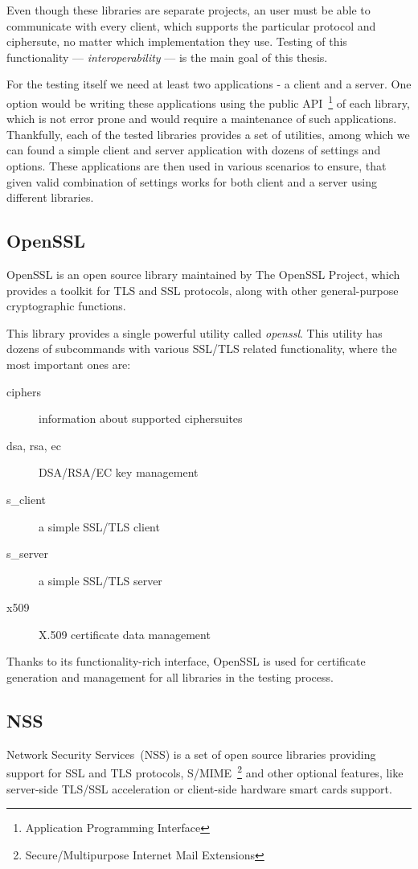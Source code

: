     Even though these libraries are
    separate projects, an user must be able to communicate with every client,
    which supports the particular protocol and ciphersute, no matter which
    implementation they use. Testing of this functionality --- \textit{interoperability} ---
    is the main goal of this thesis.

    For the testing itself we need at least two applications - a client and a server.
    One option would be writing these applications using the public
    API~\footnote{Application Programming Interface} of each library,
    which is not error prone and would require a maintenance of such applications.
    Thankfully, each of the tested libraries provides a set of utilities,
    among which we can found a simple client and server application with
    dozens of settings and options. These applications are then used in
    various scenarios to ensure, that given valid combination of settings works
    for both client and a server using different libraries.

\subsection{OpenSSL}
    OpenSSL is an open source library maintained by The OpenSSL Project,
    which provides a toolkit for TLS and SSL
    protocols, along with other general-purpose cryptographic functions.

    This library provides a single powerful utility called \textit{openssl}. This
    utility has dozens of subcommands with various SSL/TLS related functionality,
    where the most important ones are:
    \begin{description}
        \item [ciphers] information about supported ciphersuites
        \item [dsa, rsa, ec] DSA/RSA/EC key management
        \item [s\_client] a simple SSL/TLS client
        \item [s\_server] a simple SSL/TLS server
        \item [x509] X.509 certificate data management
    \end{description}

    Thanks to its functionality-rich interface, OpenSSL is used for certificate
    generation and management for all libraries in the testing process.

\subsection{NSS}
    Network Security Services~(NSS) is a set of open source libraries providing
    support for SSL and TLS protocols,
    S/MIME~\footnote{Secure/Multipurpose Internet Mail Extensions}
    and other optional features, like
    server-side TLS/SSL acceleration or client-side hardware smart cards support.

